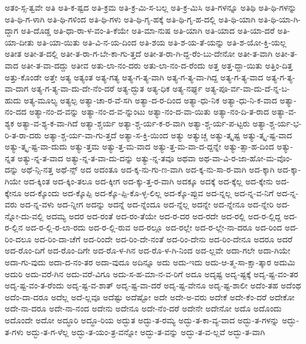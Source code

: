 {ಅತಂ-ಸ್ಸ-ತ್ವವೇ
ಅತಿ
ಅತಿ-ಕ-ಷ್ಟದ
ಅತಿ-ಕ್ರಮ
ಅತಿ-ಕ್ರ-ಮಿ-ಸ-ಬಲ್ಲ
ಅತಿ-ಕ್ರ-ಮಿಸಿ
ಅತಿ-ಗಳನ್ನೂ
ಅತಿಥಿ
ಅತಿ-ಥಿ-ಗಳನ್ನು
ಅತಿ-ಥಿ-ಗ-ಳಾಗಿ
ಅತಿ-ಥಿ-ಗಳಿಂದ
ಅತಿ-ಥಿ-ಗಳು
ಅತಿ-ಥಿ-ಗೃ-ಹಕ್ಕೆ
ಅತಿ-ಥಿ-ಗೃ-ಹ-ದಲ್ಲಿ
ಅತಿ-ಥಿ-ಯಾಗಿ
ಅತಿ-ಥಿ-ಯಾ-ಗಿ-ದ್ದಾಗ
ಅತಿ-ದೊಡ್ಡ
ಅತಿ-ಧಾ-ರಾ-ಳ-ವಂ-ತಿ-ಕೆಯೇ
ಅತಿ-ಮಾ-ನುಷ
ಅತಿ-ಯಾಗಿ
ಅತಿ-ಯಾದ
ಅತಿ-ಯಾ-ದರೆ
ಅತಿ-ಯಾ-ದೀತು
ಅತಿ-ಯಾ-ಯಿತು
ಅತಿ-ವಿ-ನ-ಯ-ದಿಂದ
ಅತಿ-ಶಯ
ಅತಿ-ಶ-ಯ-ತೆ-ಯನ್ನು
ಅತಿ-ಶ-ಯೋ-ಕ್ತಿ-ಯಲ್ಲ
ಅತೀತ
ಅತೀ-ತ-ದಲ್ಲಿ
ಅತೀ-ತ-ರಾ-ಗ-ಬೇ-ಕಾ-ಗು-ತ್ತದೆ
ಅತೀ-ತ-ರಾ-ಗಿ-ದ್ದ-ರೆಂ-ಬು-ದೇನೋ
ಅತೀ-ತ-ವಾಗಿ
ಅತೀ-ತ-ವಾದ
ಅತೀ-ತ-ವಾ-ದದ್ದು
ಅತೀವ
ಅತು-ಲಾ-ನಂ-ದರು
ಅತು-ಲಾ-ನಂ-ದ-ರೆಂದು
ಅತ್ತ
ಅತ್ತ-ದ್ದಾ-ಯಿತು
ಅತ್ತಿಂ-ದಿತ್ತ
ಅತ್ತು-ಕೊಂಡೇ
ಅತ್ತೇ
ಅತ್ಯ
ಅತ್ಯಂತ
ಅತ್ಯ-ಗತ್ಯ
ಅತ್ಯ-ಗ-ತ್ಯ-ವಾಗಿ
ಅತ್ಯ-ಗ-ತ್ಯ-ವಾ-ಗಿದ್ದ
ಅತ್ಯ-ಗ-ತ್ಯ-ವಾದ
ಅತ್ಯ-ಗ-ತ್ಯ-ವಾ-ದಾಗ
ಅತ್ಯ-ಗ-ತ್ಯ-ವಾ-ದು-ದೇ-ನೆಂ-ದರೆ
ಅತ್ಯ-ದ್ಭುತ
ಅತ್ಯ-ಧಿಕ
ಅತ್ಯ-ನರ್ಘ್ಯ
ಅತ್ಯ-ಪೂ-ರ್ವ-ವಾ-ದು-ದೆ-ನ್ನ-ಬ-ಹುದು
ಅತ್ಯ-ಮೂಲ್ಯ
ಅತ್ಯಲ್ಪ
ಅತ್ಯಾ-ಚಾ-ರ-ವೆ-ಸಗಿ
ಅತ್ಯಾ-ದ-ರ-ದಿಂದ
ಅತ್ಯಾ-ಧು-ನಿಕ
ಅತ್ಯಾ-ಧು-ನಿ-ಕ-ವಾದ
ಅತ್ಯಾ-ನಂ-ದದ
ಅತ್ಯಾ-ನಂ-ದ-ವನ್ನು
ಅತ್ಯಾ-ನಂ-ದ-ವ-ನ್ನುಂಟು
ಅತ್ಯಾ-ನಂ-ದ-ವಾ-ಯಿತು
ಅತ್ಯಾ-ನಂ-ದಿ-ತ-ರಾದ
ಅತ್ಯಾ-ವ-ಶ್ಯಕ
ಅತ್ಯಾ-ವ-ಶ್ಯ-ಕ-ವಾ-ಗಿದೆ
ಅತ್ಯಾ-ಶ್ಚರ್ಯ
ಅತ್ಯಾ-ಶ್ಚ-ರ್ಯ-ಕ-ರ-ವಾಗಿ
ಅತ್ಯಾ-ಶ್ಚ-ರ್ಯ-ಪ-ಟ್ಟರು
ಅತ್ಯಾ-ಶ್ಚ-ರ್ಯ-ಭ-ರಿ-ತ-ರಾ-ದರು
ಅತ್ಯಾ-ಶ್ಚ-ರ್ಯ-ವಾ-ಗು-ತ್ತದೆ
ಅತ್ಯಾ-ಸ-ಕ್ತಿ-ಯಿಂದ
ಅತ್ಯು
ಅತ್ಯುಚ್ಚ
ಅತ್ಯು-ತ್ಕೃಷ್ಟ
ಅತ್ಯು-ತ್ಕೃ-ಷ್ಟ-ವಾದ
ಅತ್ಯು-ತ್ಕೃ-ಷ್ಟ-ವಾ-ದುದು
ಅತ್ಯು-ತ್ತಮ
ಅತ್ಯು-ತ್ತ-ಮ-ವಾದ
ಅತ್ಯು-ತ್ತ-ಮ-ವಾ-ದ-ದ್ದನ್ನೇ
ಅತ್ಯು-ತ್ಸಾ-ಹ-ದಿಂದ
ಅತ್ಯು-ನ್ನತ
ಅತ್ಯು-ನ್ನ-ತ-ವಾದ
ಅತ್ಯು-ನ್ನ-ತ-ವಾ-ದು-ದನ್ನು
ಅತ್ಯು-ನ್ನ-ತವೂ
ಅಥವಾ
ಅಥ-ವಾ-ವಿ-ರ-ಜಾ-ಹೋ-ಮ-ವೊಂ-ದನ್ನು
ಅಥೆ-ನ್ಸಿ-ನತ್ತ
ಅಥೆ-ನ್ಸ್
ಅದ
ಅದಂತೂ
ಅದ-ಕ್ಕ-ನು-ಗು-ಣ-ವಾಗಿ
ಅದ-ಕ್ಕ-ನು-ಸಾ-ರ-ವಾಗಿ
ಅದ-ಕ್ಕಾಗಿ
ಅದ-ಕ್ಕಾ-ಗಿಯೇ
ಅದ-ಕ್ಕಿಂತ
ಅದ-ಕ್ಕಿಂ-ತಲೂ
ಅದ-ಕ್ಕೀಗ
ಅದ-ಕ್ಕು-ತ್ತ-ರ-ವಾಗಿ
ಅದಕ್ಕೂ
ಅದಕ್ಕೆ
ಅದ-ಕ್ಕೆಲ್ಲ
ಅದ-ಕ್ಕೇನು
ಅದ-ಕ್ಕೇನೂ
ಅದ-ಕ್ಕೊಂದು
ಅದ-ಕ್ಕೊಪ್ಪಿ
ಅದ-ಕ್ಕೊ-ಪ್ಪಿ-ಕೊ-ಳ್ಳ-ಲಿಲ್ಲ
ಅದ-ಕ್ಕೊ-ಪ್ಪುವ
ಅದ-ನ್ನಲ್ಲ
ಅದ-ನ್ನ-ವ-ನಿಗೆ
ಅದ-ನ್ನ-ವರು
ಅದ-ನ್ನ-ವಳು
ಅದ-ನ್ನೀಗ
ಅದನ್ನು
ಅದನ್ನೆ
ಅದ-ನ್ನೆಂದೂ
ಅದ-ನ್ನೆಲ್ಲ
ಅದನ್ನೇ
ಅದ-ನ್ನೇನೂ
ಅದ-ನ್ನೇರಿ
ಅದ-ನ್ನೋ-ದು-ವಲ್ಲಿ
ಅದಮ್ಯ
ಅದರ
ಅದ-ರಂತೆ
ಅದ-ರಂ-ತೆಯೇ
ಅದ-ರ-ದರ
ಅದ-ರದೇ
ಅದ-ರಲ್ಲಿ
ಅದ-ರ-ಲ್ಲಿದ್ದ
ಅದ-ರ-ಲ್ಲಿನ
ಅದ-ರ-ಲ್ಲಿ-ರ-ಲಾ-ರದು
ಅದ-ರ-ಲ್ಲಿ-ರುವ
ಅದ-ರಲ್ಲೂ
ಅದ-ರಲ್ಲೇ
ಅದ-ರ-ಲ್ಲೇ-ನಾ-ದರೂ
ಅದ-ರಿಂದ
ಅದ-ರಿಂ-ದಲೂ
ಅದ-ರಿಂ-ದಾ-ಚೆಗೆ
ಅದ-ರಿಂದೇ
ಅದ-ರಿಂ-ದೇ-ನಂತೆ
ಅದ-ರಿಂ-ದೇನು
ಅದ-ರಿಂ-ದೇನೂ
ಅದರೂ
ಅದರೆ
ಅದ-ರೊಂ-ದಿಗೆ
ಅದ-ರೊಂ-ದಿಗೇ
ಅದ-ರೊ-ಳ-ಗಿನ
ಅದ-ರೊ-ಳ-ಗಿ-ನಿಂದ
ಅದ-ಲ್ಲವೇ
ಅದಾ-ಗಲೇ
ಅದಾ-ಗಿಯೇ
ಅದಾ-ಗು-ವುದು
ಅದಾ-ದ-ನಂ-ತರ
ಅದಾ-ವುದೂ
ಅದಿನ್ನೂ
ಅದು
ಅದು-ಇದು
ಅದು-ಆ-ತ್ಮ-ಸಾ-ಕ್ಷಾ-ತ್ಕಾರ
ಅದುಮಿ
ಅದುರಿ
ಅದು-ವರೆ-ಗಿನ
ಅದು-ವರೆ-ವಿಗೂ
ಅದು-ಸ-ಹ-ಮಾ-ನ-ವ-ರಿಗೆ
ಅದೂ
ಅದೃಷ್ಟ
ಅದೃ-ಷ್ಟಕ್ಕೆ
ಅದೃ-ಷ್ಟ-ವಂ-ತರ
ಅದೃ-ಷ್ಟ-ವಂ-ತ-ರೆಂದು
ಅದೃ-ಷ್ಟ-ವ-ಶಾತ್
ಅದೃ-ಷ್ಟ-ವಾ-ದರೆ
ಅದೃ-ಷ್ಟ-ವೇನೂ
ಅದೃ-ಷ್ಟ-ಶಾಲೀ
ಅದೆಂ-ತಹ
ಅದೆಂಥ
ಅದೆಂ-ದಾ-ದರೂ
ಅದೆಲ್ಲ
ಅದೆ-ಲ್ಲವೂ
ಅದೆಷ್ಟು
ಅದೆಷ್ಟೋ
ಅದೇ
ಅದೇ-ಅ-ವರು
ಅದೇಕೆ
ಅದೇ-ಕೆಂ-ದರೆ
ಅದೇಕೋ
ಅದೇ-ನಾ-ದರೂ
ಅದೇ-ನಾ-ನಂದ
ಅದೇನು
ಅದೇನೂ
ಅದೇ-ನೆಂ-ದರೆ
ಅದೇನೇ
ಅದೇನೋ
ಅದೊ
ಅದೊಂದು
ಅದೊಂದೇ
ಅದೋ
ಅದ್ಧೂರಿ
ಅದ್ಧೂ-ರಿಯ
ಅದ್ಭುತ
ಅದ್ಭು-ತ-ರಮ್ಯ
ಅದ್ಭು-ತ-ಕಾ-ವ್ಯ-ವಾದ
ಅದ್ಭು-ತ-ಗಳನ್ನು
ಅದ್ಭು-ತ-ಗಳು
ಅದ್ಭು-ತ-ಗ-ಳೆಲ್ಲ
ಅದ್ಭು-ತ-ಯಂ-ತ್ರ-ವನ್ನೋ
ಅದ್ಭು-ತ-ವನ್ನು
ಅದ್ಭು-ತ-ವ-ಲ್ಲವೆ
ಅದ್ಭು-ತ-ವಾಗಿ
}
